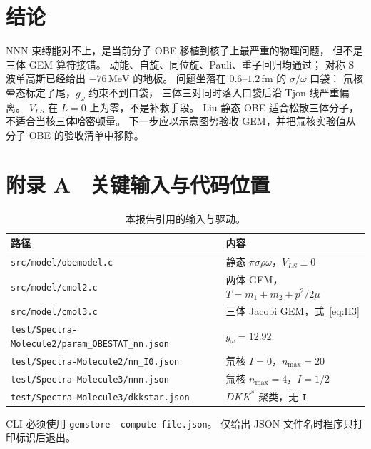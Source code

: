 \documentclass[12pt,a4paper]{article}
\newcommand{\MeV}{\,\mathrm{MeV}}
\newcommand{\fm}{\,\mathrm{fm}}
\begin{document}
\section{结论}

NNN 束缚能对不上，是当前分子 OBE 移植到核子上最严重的物理问题，
但不是三体 GEM 算符接错。
动能、自旋、同位旋、Pauli、重子回归均通过；
对称 S 波单高斯已经给出 $-76\MeV$ 的地板。
问题坐落在 $0.6$--$1.2\fm$ 的 $\sigma/\omega$ 口袋：
氘核晕态标定了尾，$g_\omega$ 约束不到口袋，
三体三对同时落入口袋后沿 Tjon 线严重偏离。
$V_{LS}$ 在 $L=0$ 上为零，不是补救手段。
Liu 静态 OBE 适合松散三体分子，不适合当核三体哈密顿量。
下一步应以示意图势验收 GEM，并把氚核实验值从分子 OBE 的验收清单中移除。

\section*{附录 A  \ 关键输入与代码位置}

\begin{table}[htbp]
\centering
\caption{本报告引用的输入与驱动。}
\label{tab:files}
{\small
\begin{tabular}{@{}p{}p{}@{}}
\toprule
路径 & 内容 \\
\midrule
\texttt{src/model/obemodel.c} & 静态 $\pi\sigma\rho\omega$，$V_{LS}\equiv 0$ \\
\texttt{src/model/cmol2.c} & 两体 GEM，$T=m_1+m_2+p^2/2\mu$ \\
\texttt{src/model/cmol3.c} & 三体 Jacobi GEM，式~\eqref{eq:H3} \\
\texttt{test/Spectra-Molecule2/param\_OBESTAT\_nn.json} & $g_\omega=12.92$ \\
\texttt{test/Spectra-Molecule2/nn\_I0.json} & 氘核 $I=0$，$n_{\max}=20$ \\
\texttt{test/Spectra-Molecule3/nnn.json} & 氚核 $n_{\max}=4$，$I=1/2$ \\
\texttt{test/Spectra-Molecule3/dkkstar.json} & $DKK^*$ 聚类，无 \texttt{I} \\
\bottomrule
\end{tabular}
}
\end{table}

CLI 必须使用 \texttt{gemstore --compute file.json}。
仅给出 JSON 文件名时程序只打印标识后退出。
\end{document}
